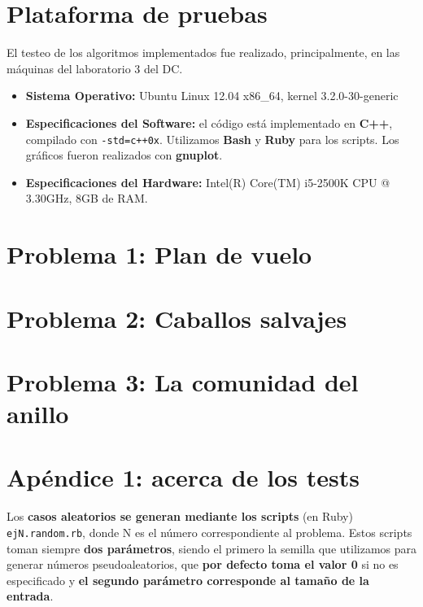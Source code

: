 \documentclass[a4paper]{article}
\begin{document}
\section{Plataforma de pruebas}
El testeo de los algoritmos implementados fue realizado, principalmente, en las máquinas del laboratorio 3 del DC. \newline
\begin{itemize}
  \item \textbf{Sistema Operativo:} Ubuntu Linux 12.04 x86_64, kernel 3.2.0-30-generic

  \item \textbf{Especificaciones del Software:} el código está implementado en \textbf{C++}, compilado con \verb|-std=c++0x|.
  Utilizamos \textbf{Bash} y \textbf{Ruby} para los scripts. Los gráficos fueron realizados con \textbf{gnuplot}.

  \item \textbf{Especificaciones del Hardware:} Intel(R) Core(TM) i5-2500K CPU @ 3.30GHz, 8GB de RAM.
\end{itemize}

\newpage

\section{Problema 1: Plan de vuelo}


\newpage

\section{Problema 2: Caballos salvajes}


\newpage

\section{Problema 3: La comunidad del anillo}


\newpage

\section{Apéndice 1: acerca de los tests}

Los \textbf{casos aleatorios se generan mediante los scripts} (en Ruby) \verb|ejN.random.rb|, donde
N es el número correspondiente al problema. Estos scripts toman siempre \textbf{dos parámetros},
siendo el primero la semilla que utilizamos para generar números pseudoaleatorios, que
\textbf{por defecto toma el valor 0} si no es especificado y \textbf{el segundo parámetro corresponde
al tamaño de la entrada}.
\end{document}
